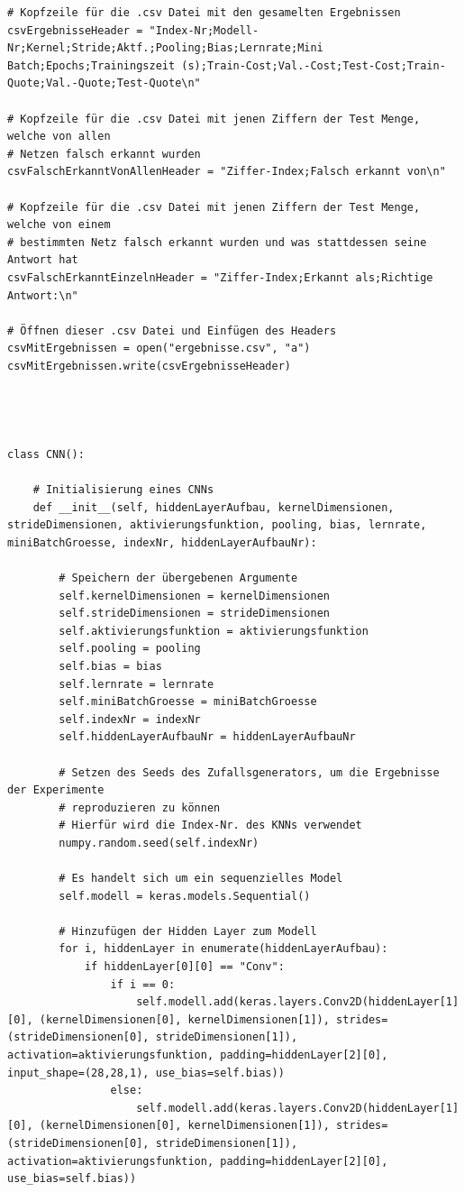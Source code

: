 \documentclass[a4paper,12pt,ngerman,oneside]{scrreprt}	%
\begin{document}
{\begin{lstlisting}
# Kopfzeile für die .csv Datei mit den gesamelten Ergebnissen
csvErgebnisseHeader = "Index-Nr;Modell-Nr;Kernel;Stride;Aktf.;Pooling;Bias;Lernrate;Mini Batch;Epochs;Trainingszeit (s);Train-Cost;Val.-Cost;Test-Cost;Train-Quote;Val.-Quote;Test-Quote\n"

# Kopfzeile für die .csv Datei mit jenen Ziffern der Test Menge, welche von allen
# Netzen falsch erkannt wurden
csvFalschErkanntVonAllenHeader = "Ziffer-Index;Falsch erkannt von\n"

# Kopfzeile für die .csv Datei mit jenen Ziffern der Test Menge, welche von einem
# bestimmten Netz falsch erkannt wurden und was stattdessen seine Antwort hat
csvFalschErkanntEinzelnHeader = "Ziffer-Index;Erkannt als;Richtige Antwort:\n"

# Öffnen dieser .csv Datei und Einfügen des Headers
csvMitErgebnissen = open("ergebnisse.csv", "a")
csvMitErgebnissen.write(csvErgebnisseHeader)




class CNN():
	
	# Initialisierung eines CNNs
	def __init__(self, hiddenLayerAufbau, kernelDimensionen, strideDimensionen, aktivierungsfunktion, pooling, bias, lernrate, miniBatchGroesse, indexNr, hiddenLayerAufbauNr):
	
		# Speichern der übergebenen Argumente
		self.kernelDimensionen = kernelDimensionen
		self.strideDimensionen = strideDimensionen
		self.aktivierungsfunktion = aktivierungsfunktion
		self.pooling = pooling
		self.bias = bias
		self.lernrate = lernrate
		self.miniBatchGroesse = miniBatchGroesse
		self.indexNr = indexNr
		self.hiddenLayerAufbauNr = hiddenLayerAufbauNr
		
		# Setzen des Seeds des Zufallsgenerators, um die Ergebnisse der Experimente
		# reproduzieren zu können
		# Hierfür wird die Index-Nr. des KNNs verwendet
		numpy.random.seed(self.indexNr)
		
		# Es handelt sich um ein sequenzielles Model
		self.modell = keras.models.Sequential()
		
		# Hinzufügen der Hidden Layer zum Modell
		for i, hiddenLayer in enumerate(hiddenLayerAufbau):
			if hiddenLayer[0][0] == "Conv":
				if i == 0:
					self.modell.add(keras.layers.Conv2D(hiddenLayer[1][0], (kernelDimensionen[0], kernelDimensionen[1]), strides=(strideDimensionen[0], strideDimensionen[1]), activation=aktivierungsfunktion, padding=hiddenLayer[2][0], input_shape=(28,28,1), use_bias=self.bias))
				else:
					self.modell.add(keras.layers.Conv2D(hiddenLayer[1][0], (kernelDimensionen[0], kernelDimensionen[1]), strides=(strideDimensionen[0], strideDimensionen[1]), activation=aktivierungsfunktion, padding=hiddenLayer[2][0], use_bias=self.bias))
			

\end{lstlisting}}
\end{document}
